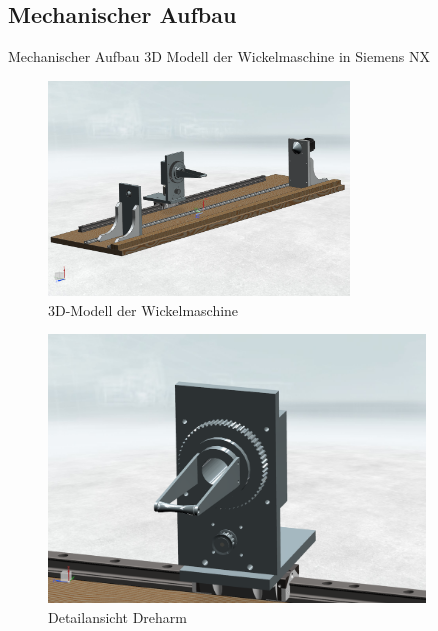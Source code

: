 \documentclass[12pt]{beamer}
\begin{document}
\subsection{Mechanischer Aufbau}
\begin{frame}{Mechanischer Aufbau}
3D Modell der Wickelmaschine in Siemens NX
\begin{figure}
	\includegraphics[width=8cm]{NX_Screenshots/gesamt3.png}
	\caption{3D-Modell der Wickelmaschine}
\end{figure}
\end{frame}

\begin{frame}
\begin{figure}
	\includegraphics[width=10cm]{NX_Screenshots/arm_vorne.png}
	\caption{Detailansicht Dreharm}
\end{figure}
\end{frame}
\end{document}
